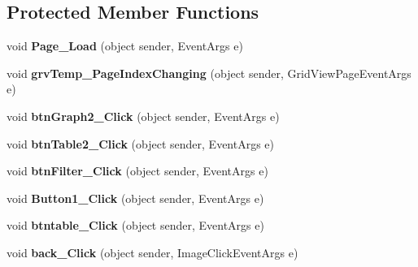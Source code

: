 \subsection*{Protected Member Functions}
\begin{DoxyCompactItemize}
\item 
\hypertarget{classusertrackothers__temperature_a5208d99c534e4fc50ff429cde6a13ca7}{void {\bfseries Page\-\_\-\-Load} (object sender, Event\-Args e)}\label{classusertrackothers__temperature_a5208d99c534e4fc50ff429cde6a13ca7}

\item 
\hypertarget{classusertrackothers__temperature_a1a62a56de4a07d7fec7c4a97ee4222c3}{void {\bfseries grv\-Temp\-\_\-\-Page\-Index\-Changing} (object sender, Grid\-View\-Page\-Event\-Args e)}\label{classusertrackothers__temperature_a1a62a56de4a07d7fec7c4a97ee4222c3}

\item 
\hypertarget{classusertrackothers__temperature_a384622e08163df578639f1fe1af8c481}{void {\bfseries btn\-Graph2\-\_\-\-Click} (object sender, Event\-Args e)}\label{classusertrackothers__temperature_a384622e08163df578639f1fe1af8c481}

\item 
\hypertarget{classusertrackothers__temperature_a64ee0659e4a89279ae90dda8c44139c7}{void {\bfseries btn\-Table2\-\_\-\-Click} (object sender, Event\-Args e)}\label{classusertrackothers__temperature_a64ee0659e4a89279ae90dda8c44139c7}

\item 
\hypertarget{classusertrackothers__temperature_a2b1ce73df0bcb459bb333653acd45745}{void {\bfseries btn\-Filter\-\_\-\-Click} (object sender, Event\-Args e)}\label{classusertrackothers__temperature_a2b1ce73df0bcb459bb333653acd45745}

\item 
\hypertarget{classusertrackothers__temperature_a5178fce6cc5ac904215c6335a7319b23}{void {\bfseries Button1\-\_\-\-Click} (object sender, Event\-Args e)}\label{classusertrackothers__temperature_a5178fce6cc5ac904215c6335a7319b23}

\item 
\hypertarget{classusertrackothers__temperature_aee5f16eb68fb9873a9803084ff8280af}{void {\bfseries btntable\-\_\-\-Click} (object sender, Event\-Args e)}\label{classusertrackothers__temperature_aee5f16eb68fb9873a9803084ff8280af}

\item 
\hypertarget{classusertrackothers__temperature_a7b27a8f4afcf1d0ce812e169b888c5a9}{void {\bfseries back\-\_\-\-Click} (object sender, Image\-Click\-Event\-Args e)}\label{classusertrackothers__temperature_a7b27a8f4afcf1d0ce812e169b888c5a9}


\end{DoxyCompactItemize}
